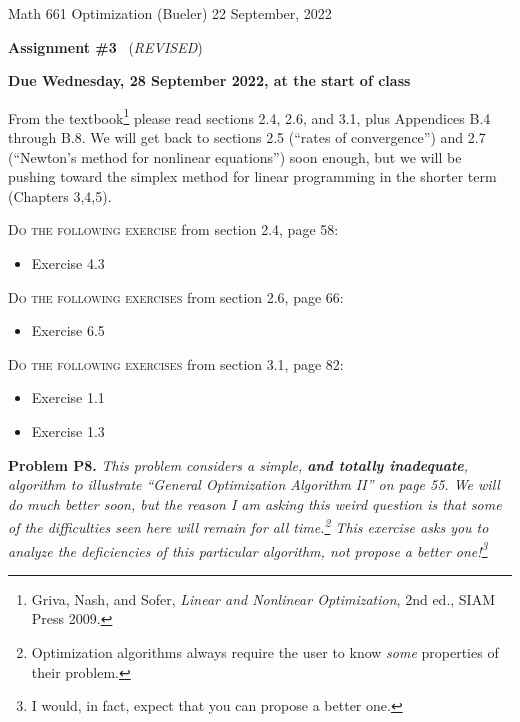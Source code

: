 \documentclass[12pt]{amsart}
\newcommand{\prob}[1]{\bigskip\noindent\textbf{#1}\quad }
\begin{document}
\scriptsize \noindent Math 661 Optimization (Bueler) \hfill 22 September, 2022
\normalsize

\medskip\bigskip

\Large\centerline{\textbf{Assignment \#3} \, (\emph{REVISED})}
\large
\bigskip

\centerline{\textbf{Due Wednesday, 28 September 2022, at the start of class}}
\bigskip
\normalsize

\thispagestyle{empty}

\bigskip
From the textbook\footnote{Griva, Nash, and Sofer, \emph{Linear and Nonlinear Optimization}, 2nd ed., SIAM Press 2009.} please read sections 2.4, 2.6, and 3.1, plus Appendices B.4 through B.8.  We will get back to sections 2.5 (``rates of convergence'') and 2.7 (``Newton's method for nonlinear equations'') soon enough, but we will be pushing toward the simplex method for linear programming in the shorter term (Chapters 3,4,5).

\bigskip
\noindent \textsc{Do the following exercise} from section 2.4, page 58:

\begin{itemize}
\item Exercise 4.3
\end{itemize}

\bigskip
\noindent \textsc{Do the following exercises} from section 2.6, page 66:

\begin{itemize}
\item Exercise 6.5
\end{itemize}

\bigskip
\noindent \textsc{Do the following exercises} from section 3.1, page 82:

\begin{itemize}
\item Exercise 1.1
\item Exercise 1.3
\end{itemize}

\prob{Problem P8.}  \emph{This problem considers a simple, \textbf{\emph{and totally inadequate}}, algorithm to illustrate ``General Optimization Algorithm II'' on page 55.  We will do much better soon, but the reason I am asking this weird question is that some of the difficulties seen here will remain for all time.\footnote{Optimization algorithms always require the user to know \emph{some} properties of their problem.}  This exercise asks you to analyze the deficiencies of this particular algorithm, \emph{not} propose a better one!\footnote{I would, in fact, expect that you can propose a better one.}}
\end{document}
